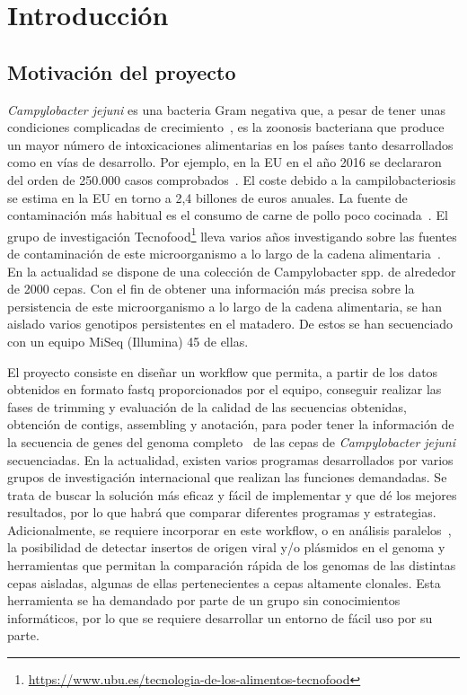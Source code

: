 \chapter{Introducción} 
\label{chap:intro}

\vspace{-0.2cm}

\section{Motivación del proyecto}
\textit{Campylobacter jejuni} es una bacteria Gram negativa que, a pesar de tener unas condiciones complicadas de crecimiento~\cite{garciasanchez2017}, es la zoonosis bacteriana que produce un mayor número de intoxicaciones alimentarias en los países tanto desarrollados como en vías de desarrollo. Por ejemplo, en la EU en el año 2016 se declararon del orden de 250.000 casos comprobados~\cite{report2016}. El coste debido a la campilobacteriosis se estima en la EU en torno a 2,4 billones de euros anuales. La fuente de contaminación más habitual es el consumo de carne de pollo poco cocinada~\cite{GarciaSanchez2018}. El grupo de investigación Tecnofood\footnote{\url{https://www.ubu.es/tecnologia-de-los-alimentos-tecnofood}} lleva varios años investigando sobre las fuentes de contaminación de este microorganismo a lo largo de la cadena alimentaria~\cite{garciasanchez2017, GarciaSanchez2018, Melero2012}. En la actualidad se dispone de una colección de Campylobacter spp. de alrededor de 2000 cepas. Con el fin de obtener una información más precisa sobre la persistencia de este microorganismo a lo largo de la cadena alimentaria, se han aislado varios genotipos persistentes en el matadero. De estos se han secuenciado con un equipo MiSeq (Illumina) 45 de ellas.

El proyecto consiste en diseñar un workflow que permita, a partir de los datos obtenidos en formato fastq proporcionados por el equipo, conseguir realizar las fases de trimming y evaluación de la calidad de las secuencias obtenidas, obtención de contigs, assembling y anotación, para poder tener la información de la secuencia de genes del genoma completo~\cite{Clark2016, Llarena2017, Zhao2016} de las cepas de \textit{Campylobacter jejuni} secuenciadas. En la actualidad, existen varios programas desarrollados por varios grupos de investigación internacional que realizan las funciones demandadas. Se trata de buscar la solución más eficaz y fácil de implementar y que dé los mejores resultados, por lo que habrá que comparar diferentes programas y estrategias. Adicionalmente, se requiere incorporar en este workflow, o en análisis paralelos~\cite{Skarp2015}, la posibilidad de detectar insertos de origen viral y/o plásmidos en el genoma y herramientas que permitan la comparación rápida de los genomas de las distintas cepas aisladas, algunas de ellas pertenecientes a cepas altamente clonales. Esta herramienta se ha demandado por parte de un grupo sin conocimientos informáticos, por lo que se requiere desarrollar un entorno de fácil uso por su parte.


